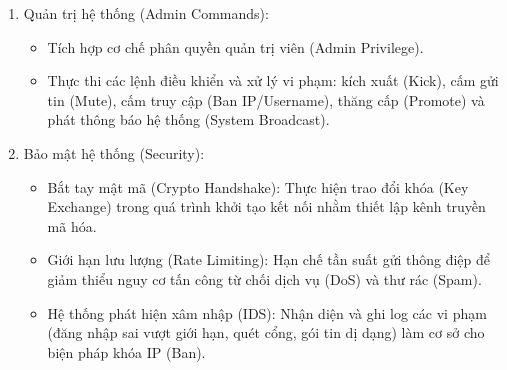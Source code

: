 \begin{enumerate}
    \item Quản trị hệ thống (Admin Commands):
    \begin{itemize}[label={-}]
        \item Tích hợp cơ chế phân quyền quản trị viên (Admin Privilege).
        \item Thực thi các lệnh điều khiển và xử lý vi phạm: kích xuất (Kick), cấm gửi tin (Mute), cấm truy cập (Ban IP/Username), thăng cấp (Promote) và phát thông báo hệ thống (System Broadcast).
    \end{itemize}

    \item Bảo mật hệ thống (Security):
    \begin{itemize}[label={-}]
        \item Bắt tay mật mã (Crypto Handshake): Thực hiện trao đổi khóa (Key Exchange) trong quá trình khởi tạo kết nối nhằm thiết lập kênh truyền mã hóa.
        \item Giới hạn lưu lượng (Rate Limiting): Hạn chế tần suất gửi thông điệp để giảm thiểu nguy cơ tấn công từ chối dịch vụ (DoS) và thư rác (Spam).
        \item Hệ thống phát hiện xâm nhập (IDS): Nhận diện và ghi log các vi phạm (đăng nhập sai vượt giới hạn, quét cổng, gói tin dị dạng) làm cơ sở cho biện pháp khóa IP (Ban).
    \end{itemize}
\end{enumerate}